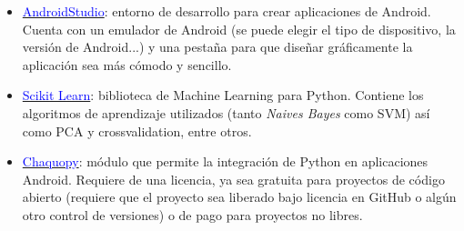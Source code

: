 \begin{itemize}
	\item \href{https://developer.android.com/studio}{\textcolor{blue}{AndroidStudio}}: entorno de desarrollo para crear aplicaciones de Android. Cuenta con un emulador de Android (se puede elegir el tipo de dispositivo, la versión de Android...) y una pestaña para que diseñar gráficamente la aplicación sea más cómodo y sencillo.
	\item \href{https://scikit-learn.org/stable/}{\textcolor{blue}{Scikit Learn}}: biblioteca de Machine Learning para Python. Contiene los algoritmos de aprendizaje utilizados (tanto \textit{Naives Bayes} como SVM) así como PCA  y crossvalidation, entre otros.
	\item \href{https://chaquo.com/chaquopy/}{\textcolor{blue}{Chaquopy}}: módulo que permite la integración de Python en aplicaciones Android. Requiere de una licencia, ya sea gratuita para proyectos de código abierto (requiere que el proyecto sea liberado bajo licencia en GitHub o algún otro control de versiones) o de pago para proyectos no libres.
\end{itemize}